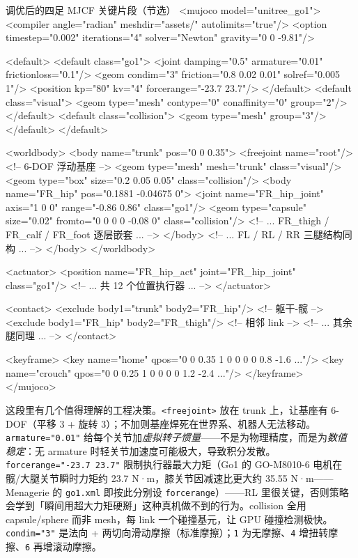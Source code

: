\begin{codebox}[text]{调优后的四足 MJCF 关键片段（节选）}
<mujoco model="unitree_go1">
  <compiler angle="radian" meshdir="assets/" autolimits="true"/>
  <option timestep="0.002" iterations="4" solver="Newton" gravity="0 0 -9.81"/>

  <default>
    <default class="go1">
      <joint damping="0.5" armature="0.01" frictionloss="0.1"/>
      <geom condim="3" friction="0.8 0.02 0.01" solref="0.005 1"/>
      <position kp="80" kv="4" forcerange="-23.7 23.7"/>
    </default>
    <default class="visual">
      <geom type="mesh" contype="0" conaffinity="0" group="2"/>
    </default>
    <default class="collision">
      <geom type="mesh" group="3"/>
    </default>
  </default>

  <worldbody>
    <body name="trunk" pos="0 0 0.35">
      <freejoint name="root"/>                 <!-- 6-DOF 浮动基座 -->
      <geom type="mesh" mesh="trunk" class="visual"/>
      <geom type="box" size="0.2 0.05 0.05" class="collision"/>
      <body name="FR_hip" pos="0.1881 -0.04675 0">
        <joint name="FR_hip_joint" axis="1 0 0" range="-0.86 0.86" class="go1"/>
        <geom type="capsule" size="0.02" fromto="0 0 0 0 -0.08 0" class="collision"/>
        <!-- ... FR_thigh / FR_calf / FR_foot 逐层嵌套 ... -->
      </body>
      <!-- ... FL / RL / RR 三腿结构同构 ... -->
    </body>
  </worldbody>

  <actuator>
    <position name="FR_hip_act" joint="FR_hip_joint" class="go1"/>
    <!-- ... 共 12 个位置执行器 ... -->
  </actuator>

  <contact>
    <exclude body1="trunk" body2="FR_hip"/>     <!-- 躯干-髋 -->
    <exclude body1="FR_hip" body2="FR_thigh"/>  <!-- 相邻 link -->
    <!-- ... 其余腿同理 ... -->
  </contact>

  <keyframe>
    <key name="home"   qpos="0 0 0.35 1 0 0 0  0 0.8 -1.6 ..."/>
    <key name="crouch" qpos="0 0 0.25 1 0 0 0  0 1.2 -2.4 ..."/>
  </keyframe>
</mujoco>
\end{codebox}

这段里有几个值得理解的工程决策。\texttt{<freejoint>} 放在 trunk 上，让基座有 6-DOF（平移 3 + 旋转 3）；不加则基座焊死在世界系、机器人无法移动。\texttt{armature="0.01"} 给每个关节加\emph{虚拟转子惯量}——不是为物理精度，而是为\emph{数值稳定}：无 armature 时轻关节加速度可能极大，导致积分发散。\texttt{forcerange="-23.7 23.7"} 限制执行器最大力矩（Go1 的 GO-M8010-6 电机在髋/大腿关节瞬时力矩约 23.7 N·m，膝关节因减速比更大约 35.55 N·m——Menagerie 的 \texttt{go1.xml} 即按此分别设 \texttt{forcerange}）——RL 里很关键，否则策略会学到「瞬间用超大力矩硬掰」这种真机做不到的行为。collision 全用 capsule/sphere 而非 mesh，每 link 一个碰撞基元，让 GPU 碰撞检测极快。\texttt{condim="3"} 是法向 + 两切向滑动摩擦（标准摩擦）；\texttt{1} 为无摩擦、\texttt{4} 增扭转摩擦、\texttt{6} 再增滚动摩擦。

